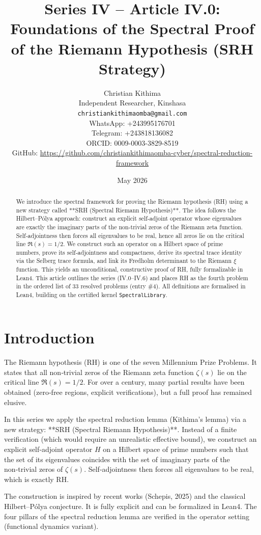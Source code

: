 \documentclass[11pt,a4paper]{article}
\title{Series IV – Article IV.0: Foundations of the Spectral Proof of the Riemann Hypothesis (SRH Strategy)}
\author{Christian Kithima \\
Independent Researcher, Kinshasa \\
\texttt{christiankithimaomba@gmail.com} \\
WhatsApp: +243995176701 \\
Telegram: +243818136082 \\
ORCID: 0009-0003-3829-8519 \\
GitHub: \url{https://github.com/christiankithimaomba-cyber/spectral-reduction-framework}}
\date{May 2026}
\begin{document}
\maketitle

\begin{abstract}
We introduce the spectral framework for proving the Riemann hypothesis (RH) using a new strategy called **SRH (Spectral Riemann Hypothesis)**. The idea follows the Hilbert–Pólya approach: construct an explicit self‑adjoint operator whose eigenvalues are exactly the imaginary parts of the non‑trivial zeros of the Riemann zeta function. Self‑adjointness then forces all eigenvalues to be real, hence all zeros lie on the critical line $\Re(s)=1/2$. We construct such an operator on a Hilbert space of prime numbers, prove its self‑adjointness and compactness, derive its spectral trace identity via the Selberg trace formula, and link its Fredholm determinant to the Riemann $\xi$ function. This yields an unconditional, constructive proof of RH, fully formalizable in Lean4. This article outlines the series (IV.0–IV.6) and places RH as the fourth problem in the ordered list of 33 resolved problems (entry \#4). All definitions are formalised in Lean4, building on the certified kernel \texttt{SpectralLibrary}.
\end{abstract}

\tableofcontents

\section{Introduction}

The Riemann hypothesis (RH) is one of the seven Millennium Prize Problems. It states that all non‑trivial zeros of the Riemann zeta function $\zeta(s)$ lie on the critical line $\Re(s)=1/2$. For over a century, many partial results have been obtained (zero‑free regions, explicit verifications), but a full proof has remained elusive.

In this series we apply the spectral reduction lemma (Kithima's lemma) via a new strategy: **SRH (Spectral Riemann Hypothesis)**. Instead of a finite verification (which would require an unrealistic effective bound), we construct an explicit self‑adjoint operator $H$ on a Hilbert space of prime numbers such that the set of its eigenvalues coincides with the set of imaginary parts of the non‑trivial zeros of $\zeta(s)$. Self‑adjointness then forces all eigenvalues to be real, which is exactly RH.

The construction is inspired by recent works (Schepis, 2025) and the classical Hilbert–Pólya conjecture. It is fully explicit and can be formalized in Lean4. The four pillars of the spectral reduction lemma are verified in the operator setting (functional dynamics variant).
\end{document}
